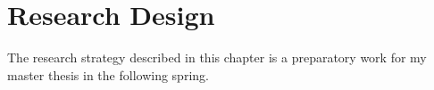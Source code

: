 \chapter{Research Design}

  The research strategy described in this chapter is a preparatory work for my master thesis in the following spring. 
  
   

 

  

      


    









